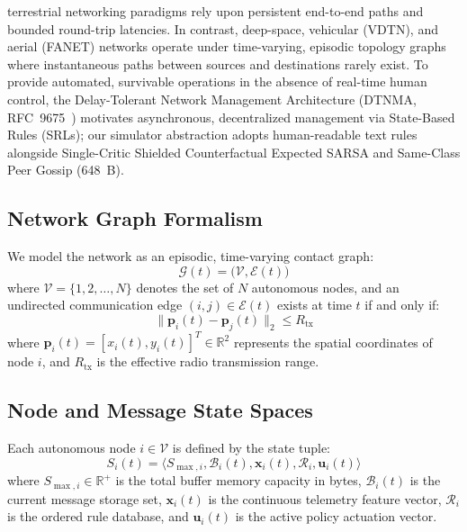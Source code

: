 \documentclass[journal,compsoc]{IEEEtran}
\begin{document}
 terrestrial networking paradigms rely upon persistent end-to-end paths and bounded round-trip latencies. In contrast, deep-space, vehicular (VDTN), and aerial (FANET) networks operate under time-varying, episodic topology graphs where instantaneous paths between sources and destinations rarely exist. To provide automated, survivable operations in the absence of real-time human control, the Delay-Tolerant Network Management Architecture (DTNMA, RFC~9675~\cite{rfc9675}) motivates asynchronous, decentralized management via State-Based Rules (SRLs); our simulator abstraction adopts human-readable text rules alongside Single-Critic Shielded Counterfactual Expected SARSA and Same-Class Peer Gossip (648~B).

\subsection{Network Graph Formalism}
We model the network as an episodic, time-varying contact graph:
\begin{equation}
\mathcal{G}(t) = \bigl(\mathcal{V}, \mathcal{E}(t)\bigr)
\end{equation}
where $\mathcal{V} = \{1, 2, \dots, N\}$ denotes the set of $N$ autonomous nodes, and an undirected communication edge $(i, j) \in \mathcal{E}(t)$ exists at time $t$ if and only if:
\begin{equation}
\|\mathbf{p}_i(t) - \mathbf{p}_j(t)\|_2 \le R_{\mathrm{tx}}
\end{equation}
where $\mathbf{p}_i(t) = [x_i(t), y_i(t)]^T \in \mathbb{R}^2$ represents the spatial coordinates of node $i$, and $R_{\mathrm{tx}}$ is the effective radio transmission range.

\subsection{Node and Message State Spaces}
Each autonomous node $i \in \mathcal{V}$ is defined by the state tuple:
\begin{equation}
S_i(t) = \bigl\langle S_{\max, i}, \mathcal{B}_i(t), \mathbf{x}_i(t), \mathcal{R}_i, \mathbf{u}_i(t)\bigr\rangle
\end{equation}
where $S_{\max, i} \in \mathbb{R}^+$ is the total buffer memory capacity in bytes, $\mathcal{B}_i(t)$ is the current message storage set, $\mathbf{x}_i(t)$ is the continuous telemetry feature vector, $\mathcal{R}_i$ is the ordered rule database, and $\mathbf{u}_i(t)$ is the active policy actuation vector.
\end{document}
